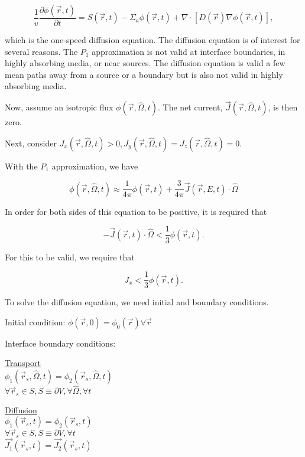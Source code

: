 \documentclass[12pt]{article}
\newcommand{\rvec}{\ensuremath{\vec{r}}}
\newcommand{\omvec}{\ensuremath{\hat{\Omega}}}
\begin{document}
\begin{equation*}
\frac{1}{v}\frac{\partial\phi(\rvec,t)}{\partial t} = S(\rvec,t) - \Sigma_a\phi(\rvec,t) + 
\nabla\cdot[D(\rvec)\nabla\phi(\rvec,t)],
\end{equation*}

which is the one-speed diffusion equation. The diffusion equation is of interest for several reasons. The
$P_1$ approximation is not valid at interface boundaries, in highly absorbing media, or near sources. The
diffusion equation is valid a few mean paths away from a source or a boundary but is also not valid in
highly absorbing media.


Now, assume an isotropic flux $\phi(\rvec,\omvec,t)$. The net current, $\vec{J}(\rvec,\omvec,t)$, is 
then zero.


Next, consider $J_x(\rvec,\omvec,t) > 0, J_y(\rvec,\omvec,t) = J_z(\rvec,\omvec,t) = 0$.


With the $P_1$ approximation, we have

\begin{equation*}
\phi(\rvec,\omvec,t)\approx\frac{1}{4\pi}\phi(\rvec,t)+\frac{3}{4\pi}\vec{J}(\rvec,E,t)\cdot\omvec
\end{equation*}

In order for both sides of this equation to be positive, it is required that

\begin{equation*}
-\vec{J}(\rvec,t)\cdot\omvec < \frac{1}{3}\phi(\rvec,t).
\end{equation*}

For this to be valid, we require that

\begin{equation*}
J_x < \frac{1}{3}\phi(\rvec,t).
\end{equation*}

To solve the diffusion equation, we need initial and boundary conditions.


Initial condition: $\phi(\rvec,0) = \phi_0(\rvec) \forall\rvec$


Interface boundary conditions:

\begin{minipage}[t]{0.5\textwidth}
\underline{Transport} \\
$\phi_1(\rvec_s,\omvec,t) = \phi_2(\rvec_s,\omvec,t)$ \\
$\forall\rvec_s \in S, S \equiv \partial V, \forall \omvec, \forall t$
\end{minipage}
\begin{minipage}[t]{0.5\textwidth}
\underline{Diffusion} \\
$\phi_1(\rvec_s,t) = \phi_2(\rvec_s,t)$ \\
$\forall\rvec_s \in S, S \equiv \partial V, \forall t$ \\
$\vec{J_1}(\rvec_s,t) = \vec{J_2}(\rvec_s,t)$
\end{minipage}
\end{document}
